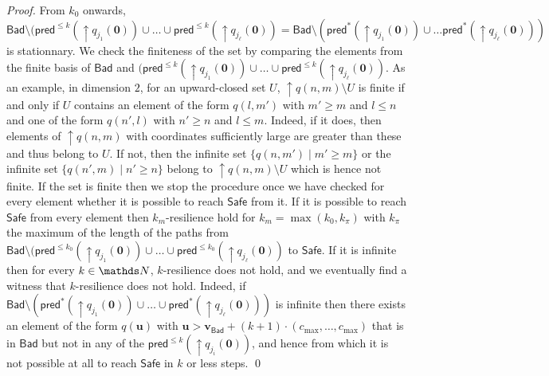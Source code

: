 \documentclass[runningheads]{llncs}
\newcommand{\mathieu}[1]{\todo[inline,color=blue!20]{{\bf MH:} #1}}
\newcommand{\pred}{\textsf{pred}}
\newcommand{\Bad}{\textsf{Bad}}
\newcommand{\Safe}{\textsf{Safe}}
\begin{document}
\begin{proof}
From $k_0$ onwards,
$\Bad \setminus (\pred^{\leq k}(\mathop{\uparrow} q_{j_1}(\textbf{0}))\cup \ldots \cup \pred^{\leq k}(\mathop{\uparrow} q_{j_\ell}(\textbf{0}))= 
\Bad \setminus (\pred^{*}(\mathop{\uparrow} q_{j_1}(\textbf{0})) \cup \ldots \pred^{*}(\mathop{\uparrow} q_{j_\ell}(\textbf{0})) )$
is stationnary. 
We check the finiteness of the set by comparing the elements from the finite basis of $\Bad$ and
$(\pred^{\leq k}(\mathop{\uparrow} q_{j_1}(\textbf{0}))\cup \ldots \cup \pred^{\leq k}(\mathop{\uparrow} q_{j_\ell}(\textbf{0}))$.
%
As an example, in dimension $2$, for an upward-closed set $U$, $\mathop{\uparrow} q(n,m) \setminus U$ is finite if and only if $U$ contains an element of the form $q(l,m')$ with $m' \geq m$ and $l \leq n$
and one of the form $q(n',l)$ with $n' \geq n$ and $l \leq m$. Indeed, if it does, then
elements of $\mathop{\uparrow} q(n,m)$ with coordinates sufficiently large are greater than these and thus belong to $U$.
If not, then the infinite set $\{q(n,m') \mid m' \geq m \}$ or the infinite set
$\{q(n',m) \mid n' \geq n \}$   belong to $\mathop{\uparrow} q(n,m) \setminus U$ which is hence not finite.
If the set is finite then we stop the procedure once we have checked for every element
whether it is possible to reach $\Safe$ from it.
If it is possible to reach $\Safe$ from every element then {\sc $k_m$-resilience}
hold
for $k_m = \max(k_0, k_{\pi})$ with 
$k_{\pi}$ the maximum of the length of the paths from 
$\Bad \setminus (\pred^{\leq k_0}(\mathop{\uparrow} q_{j_1}(\textbf{0}))\cup \ldots \cup \pred^{\leq k_0}(\mathop{\uparrow} q_{j_\ell}(\textbf{0}))$ to $\Safe$.
If it is infinite then
for every $k \in \N$,
$k$-resilience does not hold, 
and we eventually find a witness that $k$-resilience does not hold.
Indeed, 
if
$\Bad \setminus (\pred^{*}(\mathop{\uparrow} q_{j_1}(\textbf{0})) \cup \ldots \cup \pred^{*}(\mathop{\uparrow} q_{j_\ell}(\textbf{0})) )$
is
infinite
then
there exists an element of the form $q(\textbf{u} )$
with $\textbf{u} > \textbf{v}_{\Bad} + (k+1) \cdot (c_{\max}, \ldots, c_{\max})$ 
that is in $\Bad$ but not in any of the $\pred^{\leq k}(\mathop{\uparrow} q_{j_i}(\textbf{0}))$,
and hence from which it is not possible at all to reach
$\Safe$ in $k$ or less steps.
\qed
\end{proof}
\end{document}
